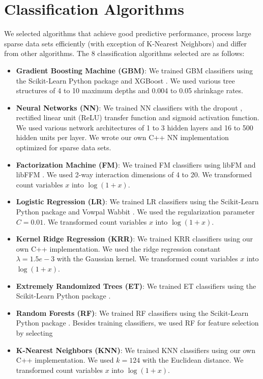 \section{Classification Algorithms}
We selected algorithms that achieve good predictive performance, process large sparse data sets efficiently (with exception of K-Nearest Neighbors) and differ from other algorithms.  The 8 classification algorithms selected are as follows:
\begin{itemize}
\setlength\itemsep{0em}
\item \textbf{Gradient Boosting Machine (GBM)}: We trained GBM classifiers using the Scikit-Learn Python package \cite{scikit-learn} and XGBoost \cite{chen2015xgboost}.  We used various tree structures of 4 to 10 maximum depths and 0.004 to 0.05 shrinkage rates.
\item \textbf{Neural Networks (NN)}: We trained NN classifiers with the dropout \cite{srivastava2014dropout}, rectified linear unit (ReLU) \cite{dahl2013improving} transfer function and sigmoid activation function.  We used various network architectures of 1 to 3 hidden layers and 16 to 500 hidden units per layer.  We wrote our own C++ NN implementation optimized for sparse data sets.  
\item \textbf{Factorization Machine (FM)}: We trained FM classifiers using libFM \cite{rendle2012factorization} and libFFM \cite{libffm}.  We used 2-way interaction dimensions of 4 to 20.  We transformed count variables $x$ into $\log{(1 + x)}$.
\item \textbf{Logistic Regression (LR)}: We trained LR classifiers using the Scikit-Learn Python package \cite{scikit-learn} and Vowpal Wabbit \cite{langford2007vowpal}.  We used the regularization parameter $C=0.01$.  We transformed count variables $x$ into $\log{(1 + x)}$.
\item \textbf{Kernel Ridge Regression (KRR)}: We trained KRR classifiers using our own C++ implementation.  We used the ridge regression constant $\lambda=1.5e-3$ with the Gaussian kernel.  We transformed count variables $x$ into $\log{(1 + x)}$.
\item \textbf{Extremely Randomized Trees (ET)}: We trained ET classifiers using the Scikit-Learn Python package \cite{scikit-learn}.
\item \textbf{Random Forests (RF)}: We trained RF classifiers using the Scikit-Learn Python package \cite{scikit-learn}.  Besides training classifiers, we used RF for feature selection by selecting 
\item \textbf{K-Nearest Neighbors (KNN)}: We trained KNN classifiers using our own C++ implementation.  We used $k=124$ with the Euclidean distance.  We transformed count variables $x$ into $\log{(1 + x)}$.
\end{itemize}